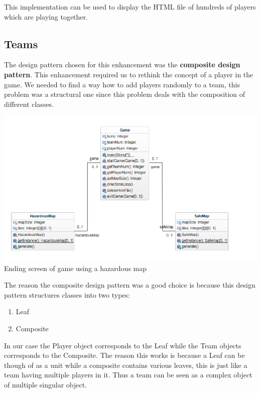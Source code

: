 \documentclass[a4paper,12pt]{extarticle}
\begin{document}
This implementation can be used to display the HTML file of hundreds of players which are playing together.
\newpage
\subsection{Teams}
The design pattern chosen for this enhancement was the \textbf{composite design pattern}. This enhancement required us to rethink the concept of a player in the game. We needed to find a way how to add players randomly to a team, this problem was a structural one since this problem deals with the composition of different classes.\\

\begin{center}
\includegraphics[scale=0.5]{Enhancement2CD.png}\\
Ending screen of game using a hazardous map
\end{center}

\noindent The reason the composite design pattern was a good choice is because this design pattern structures classes into two types:

\begin{enumerate}
\item Leaf
\item Composite
\end{enumerate}

\noindent In our case the Player object corresponds to the Leaf while the Team objects  corresponds to the Composite. The reason this works is because a Leaf can be though of as a unit while a composite contains various leaves, this is just like a team having multiple players in it. Thus a team can be seen as a complex object of multiple singular object.\\
\end{document}
